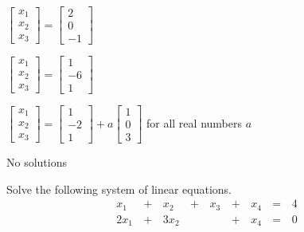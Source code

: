 \documentclass{article}
\begin{document}
\begin{readinessAssuranceTest}
  \begin{multicols}{2}
  \begin{readinessAssuranceTestChoices}
  \item \(
          \begin{bmatrix}
            x_1 \\ x_2 \\ x_3
          \end{bmatrix}=
          \begin{bmatrix}
            2 \\ 0 \\ -1
          \end{bmatrix}
        \) %
  \item \(
          \begin{bmatrix}
            x_1 \\ x_2 \\ x_3
          \end{bmatrix}=
          \begin{bmatrix}
            1 \\ -6 \\ 1
          \end{bmatrix}
        \)
  \item \(
          \begin{bmatrix}
            x_1 \\ x_2 \\ x_3
          \end{bmatrix}=
          \begin{bmatrix}
            1 \\ -2 \\ 1
          \end{bmatrix}+
          a
          \begin{bmatrix}
            1 \\ 0 \\ 3
          \end{bmatrix}
        \) for all real numbers \(a\)
  \item No solutions
  \end{readinessAssuranceTestChoices}
  \end{multicols}

\item Solve the following system of linear equations.
  \begin{alignat*}{5}
     x_1 &\,+\,& x_2 &\,+\,&  x_3 &\,+\,&  x_4 &\,=\,& 4 \\
     2x_1 &\,+\,& 3x_2 &\, \,&     &\,+\,&  x_4 &\,=\,& 0 \\
  \end{alignat*}


\end{readinessAssuranceTest}
\end{document}
